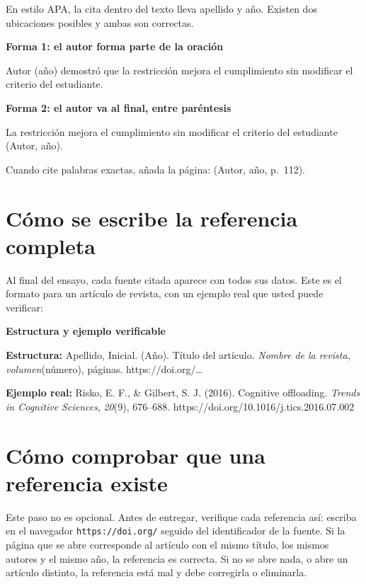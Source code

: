\documentclass[12pt,a4paper,openany]{report}
\newenvironment{ejemplo}[1]
	{\begin{lrbox}{\cajaguardada}\begin{minipage}{\dimexpr\textwidth-2\fboxsep\relax}\vspace{4pt}\textcolor{verdeejemplo}{\textbf{\sffamily\small #1}}\par\vspace{3pt}\small}
	{\vspace{4pt}\end{minipage}\end{lrbox}\par\vspace{4pt}\noindent\colorbox{cremaejemplo}{\usebox{\cajaguardada}}\par\vspace{8pt}}
\begin{document}
En estilo APA, la cita dentro del texto lleva apellido y a\~no. Existen dos ubicaciones posibles y ambas son correctas.

\begin{ejemplo}{Forma 1: el autor forma parte de la oraci\'on}
Autor (a\~no) demostr\'o que la restricci\'on mejora el cumplimiento sin modificar el criterio del estudiante.
\end{ejemplo}

\begin{ejemplo}{Forma 2: el autor va al final, entre par\'entesis}
La restricci\'on mejora el cumplimiento sin modificar el criterio del estudiante (Autor, a\~no).
\end{ejemplo}

Cuando cite palabras exactas, a\~nada la p\'agina: (Autor, a\~no, p.~112).

\section{C\'omo se escribe la referencia completa}

Al final del ensayo, cada fuente citada aparece con todos sus datos. Este es el formato para un art\'iculo de revista, con un ejemplo real que usted puede verificar:

\begin{ejemplo}{Estructura y ejemplo verificable}
\textbf{Estructura:} Apellido, Inicial. (A\~no). T\'itulo del art\'iculo. \emph{Nombre de la revista}, \emph{volumen}(n\'umero), p\'aginas. https://doi.org/\ldots

\vspace{4pt}
\textbf{Ejemplo real:} Risko, E. F., \& Gilbert, S. J. (2016). Cognitive offloading. \emph{Trends in Cognitive Sciences}, \emph{20}(9), 676--688. https://doi.org/10.1016/j.tics.2016.07.002
\end{ejemplo}

\section{C\'omo comprobar que una referencia existe}

Este paso no es opcional. Antes de entregar, verifique cada referencia as\'i: escriba en el navegador \texttt{https://doi.org/} seguido del identificador de la fuente. Si la p\'agina que se abre corresponde al art\'iculo con el mismo t\'itulo, los mismos autores y el mismo a\~no, la referencia es correcta. Si no se abre nada, o abre un art\'iculo distinto, la referencia est\'a mal y debe corregirla o eliminarla.
\end{document}
